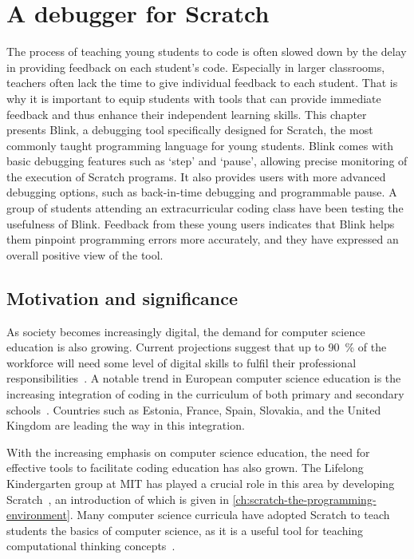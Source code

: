 \documentclass[../main]{subfiles}
\begin{document}
\chapter{A debugger for Scratch}\label{ch:blink}


The process of teaching young students to code is often slowed down by the delay in providing feedback on each student's code.
Especially in larger classrooms, teachers often lack the time to give individual feedback to each student.
That is why it is important to equip students with tools that can provide immediate feedback and thus enhance their independent learning skills.
This chapter presents Blink, a debugging tool specifically designed for Scratch, the most commonly taught programming language for young students.
Blink comes with basic debugging features such as `step' and `pause', allowing precise monitoring of the execution of Scratch programs.
It also provides users with more advanced debugging options, such as back-in-time debugging and programmable pause.
A group of students attending an extracurricular coding class have been testing the usefulness of Blink.
Feedback from these young users indicates that Blink helps them pinpoint programming errors more accurately, and they have expressed an overall positive view of the tool.

\section{Motivation and significance}\label{sec:blink-motivation}

As society becomes increasingly digital, the demand for computer science education is also growing.
Current projections suggest that up to \qty{90}{\percent} of the workforce will need some level of digital skills to fulfil their professional responsibilities~\autocite{bejakovicImportanceDigitalLiteracy2020}.
A notable trend in European computer science education is the increasing integration of coding in the curriculum of both primary and secondary schools~\autocite{balanskatComputingOurFuture2015}.
Countries such as Estonia, France, Spain, Slovakia, and the United Kingdom are leading the way in this integration.

With the increasing emphasis on computer science education, the need for effective tools to facilitate coding education has also grown.
The Lifelong Kindergarten group at MIT has played a crucial role in this area by developing Scratch~\autocite{resnickScratchProgrammingAll2009}, an introduction of which is given in \cref{ch:scratch-the-programming-environment}.
Many computer science curricula have adopted Scratch to teach students the basics of computer science, as it is a useful tool for teaching computational thinking concepts~\autocite{zhangSystematicReviewLearning2019}.
\end{document}
